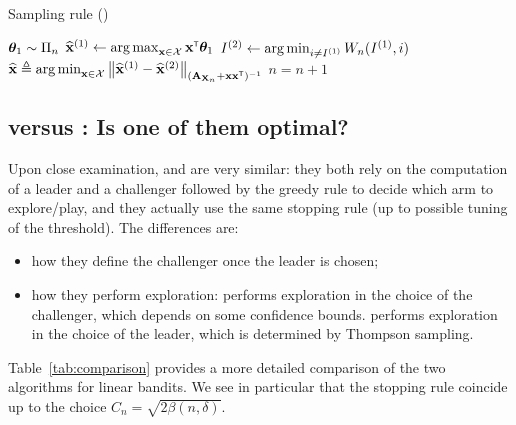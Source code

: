 \begin{algorithm}[ht]
\centering
\caption{Sampling rule (\LTCCG)}
\label{alg:lt3cg}
\begin{algorithmic}[1]
        \State {} ${\boldsymbol \theta}_1 \sim \Pi_n$
        \State $\widehat{{\bf x}}^{(1)} \leftarrow \operatorname*{arg\,max}_{{\bf x}\in\mathcal{X}} {\bf x}^\mathsf{\scriptscriptstyle T}{\boldsymbol \theta}_1$ 
	        \State $I^{(2)} \leftarrow \operatorname*{arg\,min}_{i\neq I^{(1)}}W_n(I^{(1)},i)$ 
		    \State {} $\widehat{{\bf x}} \triangleq \operatorname*{arg\,min}_{{\bf x}\in\mathcal{X}} \left\lVert\widehat{{\bf x}}^{(1)} - \widehat{{\bf x}}^{(2)}\right\rVert_{({\bf A}_{{\bf X}_n}+{\bf x}{\bf x}^\mathsf{\scriptscriptstyle T})^{-1}}$
	    \State {}
	    \State $n = n+1$
   \EndFor
\end{algorithmic}
\end{algorithm}

\subsection{\texorpdfstring{\LGapE}{} versus \texorpdfstring{\LTCCG}{}: Is one of them optimal?}\label{sec:lgc.bayesian.check}

Upon close examination, \LGapE and \LTCCG are very similar: they both rely on the computation of a leader and a challenger followed by the greedy rule to decide which arm to explore/play, and they actually use the same stopping rule (up to possible tuning of the threshold). The differences are:
\begin{itemize}
    \item how they define the challenger once the leader is chosen;
    \item how they perform exploration: \LGapE{} performs exploration in the choice of the challenger, which depends on some confidence bounds. \LTCCG{} performs exploration in the choice of the leader, which is determined by Thompson sampling.  
\end{itemize}

Table~\ref{tab:comparison} provides a more detailed comparison of the two algorithms for linear bandits. We see in particular that the stopping rule coincide up to the choice $C_n = \sqrt{2\beta(n, \delta)}$.

